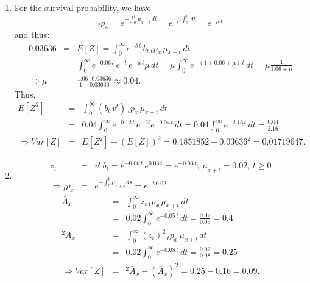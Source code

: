 \documentclass[11pt,fleqn,oneside]{book}
\begin{document}
\begin{enumerate}
\item 
For the survival probability, we have
$$
{_tp_x} = e^{-\int_0^t \mu_{x+t}\,dt} = e^{-\mu \int_0^t\,dt} = e^{-\mu\,t}
$$
and thus:
\begin{eqnarray*}
0.03636 &=& E[Z]
= \int_0^{\infty} e^{-\delta\, t}\,b_t\,{_tp_x}\,\mu_{x+t}\,dt\\
&=& \int_0^{\infty} e^{-0.06\,t}\,e^{-t}\,e^{-\mu\,t}\mu\,dt
= \mu \int_0^\infty e^{-(1+0.06 + \mu)\,t}\,dt = \mu \frac{1}{1.06 + \mu}\\
\Rightarrow \mu &=& \frac{1.06 \cdot 0.03636}{1 - 0.03636} \approx 0.04.
\end{eqnarray*}
Thus,
\begin{eqnarray*}
E[Z^2] &=& \int_0^\infty \left(b_t\,v^{t}\right)\,{_tp_x}\,\mu_{x+t}\,dt\\
&=& 0.04 \int_0^{\infty} e^{-0.12\,t}\,e^{-2t} e^{-0.04\,t}\,dt = 0.04 \int_0^{\infty} e^{-2.16\,t}\,dt = \frac{0.04}{2.16}\\
\Rightarrow Var[Z] &=& E[Z^2] - \left(E[Z]\right)^2 = 0.1851852 - 0.03636^2 = 0.01719647.
\end{eqnarray*}

\item
\begin{eqnarray*}
z_t &=& v^t\,b_t = e^{-0.06\,t}\,e^{0.03\,t} = e^{-0.03\,t},\,\mu_{x+t}=0.02,\,t \geq 0\\
\Rightarrow {_tp_x} &=& e^{-\int_0^t\mu_{x+s}\,ds} = e^{-t\,0.02}
\end{eqnarray*}
\begin{eqnarray*}
\bar{A}_x &=& \int_0^{\infty} z_t \,{_tp_x}\,\mu_{x+t}\,dt\\
&=& 0.02 \int_0^{\infty} e^{-0.05\,t}\,dt = \frac{0.02}{0.05} = 0.4\\
{^2\bar{A}_x} &=& \int_0^{\infty} (z_t)^2 \,{_tp_x}\,\mu_{x+t}\,dt\\
&=& 0.02 \int_0^{\infty} e^{-0.08\,t}\,dt = \frac{0.02}{0.08} = 0.25\\
\Rightarrow Var[Z] &=& {^2\bar{A}_x} - \left(\bar{A}_x \right)^2 = 0.25 - 0.16 = 0.09.
\end{eqnarray*}
\end{enumerate}
\normalsize
\end{document}
